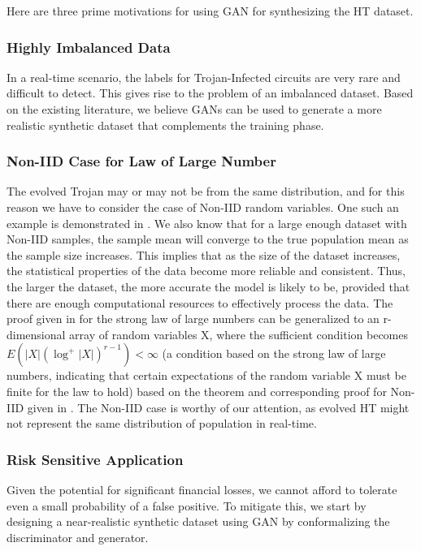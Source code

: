 Here are three prime motivations for using GAN for synthesizing the HT dataset. 

\subsubsection*{Highly Imbalanced Data} In a real-time scenario, the labels for Trojan-Infected circuits are very rare and difficult to detect. This gives rise to the problem of an imbalanced dataset. Based on the existing literature, we believe GANs can be used to generate a more realistic synthetic dataset that complements the training phase.

\subsubsection*{Non-IID Case for Law of Large Number} The evolved Trojan may or may not be from the same distribution, and for this reason we have to consider the case of Non-IID random variables. One such an example is demonstrated in \cite{yonetani2019decentralized}. We also know that for a large enough dataset with Non-IID samples, the sample mean will converge to the true population mean as the sample size increases. This implies that as the size of the dataset increases, the statistical properties of the data become more reliable and consistent. Thus, the larger the dataset, the more accurate the model is likely to be, provided that there are enough computational resources to effectively process the data. The proof given in \cite{etemadi1981elementary} for the strong law of large numbers can be generalized to an r-dimensional array of random variables X, where the sufficient condition becomes $E\left(|X|\left(\log ^{+}|X|\right)^{r-1}\right)<\infty$ (a condition based on the strong law of large numbers, indicating that certain expectations of the random variable X must be finite for the law to hold) based on the theorem and corresponding proof for Non-IID given in \cite{smythe1973strong}. The Non-IID case is worthy of our attention, as evolved HT might not represent the same distribution of population in real-time.

\subsubsection*{Risk Sensitive Application} Given the potential for significant financial losses, we cannot afford to tolerate even a small probability of a false positive. To mitigate this, we start by designing a near-realistic synthetic dataset using GAN by conformalizing the discriminator and generator. 

